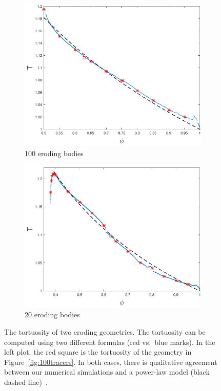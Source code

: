 \documentclass[11pt]{article}
\begin{document}
\begin{figure}[htp]
  \begin{center}
  \begin{subfigure}[b]{0.45\textwidth}
  \includegraphics[width=\textwidth]{figs/tort_eulerian100}
  \caption{100 eroding bodies}
  \end{subfigure}
  \begin{subfigure}[b]{0.45\textwidth}
  \includegraphics[width=\textwidth]{figs/tort_eulerian20}
  \caption{20 eroding bodies}
  \end{subfigure}
  \end{center}
  \caption{\label{fig:100tortuosity} The tortuosity of two eroding geometries. The tortuosity can be computed using two different formulas (red vs.~blue marks). In the left plot, the red square is the tortuosity of the geometry in Figure~\ref{fig:100tracers}. In both cases, there is qualitative agreement between our numerical simulations and a power-law model (black dashed line)~\cite{mat-kha-koz2008}.}
\end{figure}
\end{document}
